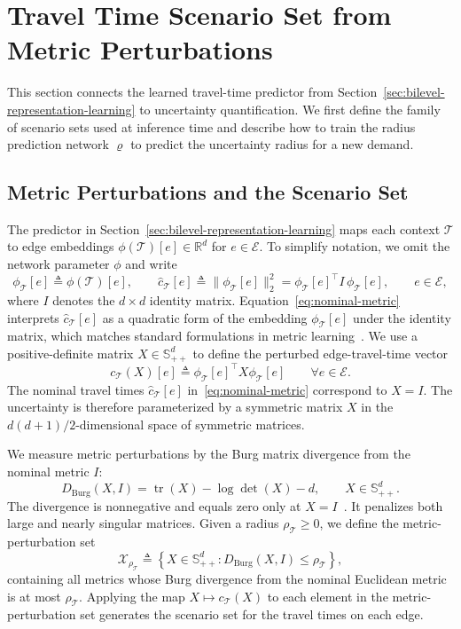 \documentclass[11pt, letterpaper, oneside, reqno]{amsart}
\DeclareMathOperator{\Tr}{tr}
\newcommand{\R}{\mathbb{R}}
\newcommand{\Let}{\triangleq}
\begin{document}
\section{Travel Time Scenario Set from Metric Perturbations} \label{sec:metric-perturbation}
This section connects the learned travel-time predictor from Section~\ref{sec:bilevel-representation-learning} to uncertainty quantification. We first define the family of scenario sets used at inference time and describe how to train the radius prediction network $\varrho$ to predict the uncertainty radius for a new demand.

\subsection{Metric Perturbations and the Scenario Set}\label{sec:metric-perturbations-scenario-set}
The predictor in Section~\ref{sec:bilevel-representation-learning} maps each context $\mathcal T$ to edge embeddings $\phi(\mathcal T)[e] \in \R^d$ for $e \in \mathcal E$. To simplify notation, we omit the network parameter $\phi$ and write
\begin{equation} \label{eq:nominal-metric}
\phi_{\mathcal T}[e] \Let \phi(\mathcal T)[e],
\qquad
\hat c_{\mathcal T}[e] \Let \|\phi_{\mathcal T}[e]\|_2^2 = \phi_{\mathcal T}[e]^\top I\,\phi_{\mathcal T}[e],
\qquad e\in\mathcal E,
\end{equation}
where $I$ denotes the $d\times d$ identity matrix. Equation~\eqref{eq:nominal-metric} interprets $\hat c_{\mathcal T}[e]$ as a quadratic form of the embedding $\phi_{\mathcal T}[e]$ under the identity matrix, which matches standard formulations in metric learning~\cite{ref:bellet2013survey}. We use a positive-definite matrix $X \in \mathbb S_{++}^d$ to define the perturbed edge-travel-time vector
\begin{equation}
c_{\mathcal T}(X)[e] \Let \phi_{\mathcal T}[e]^\top X \phi_{\mathcal T}[e]
\qquad \forall e \in \mathcal E.
\label{eq:cX}
\end{equation}
The nominal travel times $\hat c_{\mathcal T}[e]$ in~\eqref{eq:nominal-metric} correspond to $X = I$. 
The uncertainty is therefore parameterized by a symmetric matrix $X$ in the $d(d+1)/2$-dimensional space of symmetric matrices.

We measure metric perturbations by the Burg matrix divergence from the nominal metric $I$:
\[
D_{\mathrm{Burg}}(X,I)
= \Tr(X) - \log\det(X) - d,
\qquad X \in \mathbb S_{++}^d.
\]
The divergence is nonnegative and equals zero only at $X = I$~\cite{ref:kulis2006learning}. It penalizes both large and nearly singular matrices.
Given a radius $\rho_{\mathcal T} \ge 0$, we define the metric-perturbation set
\[
\mathcal X_{\rho_{\mathcal T}}
\Let
\left\{
X \in \mathbb S_{++}^d:
D_{\mathrm{Burg}}(X,I) \le \rho_{\mathcal T}
\right\},
\]
containing all metrics whose Burg divergence from the nominal Euclidean metric is at most $\rho_{\mathcal T}$. Applying the map $X \mapsto c_{\mathcal T}(X)$ to each element in the metric-perturbation set generates the scenario set for the travel times on each edge.
\end{document}
